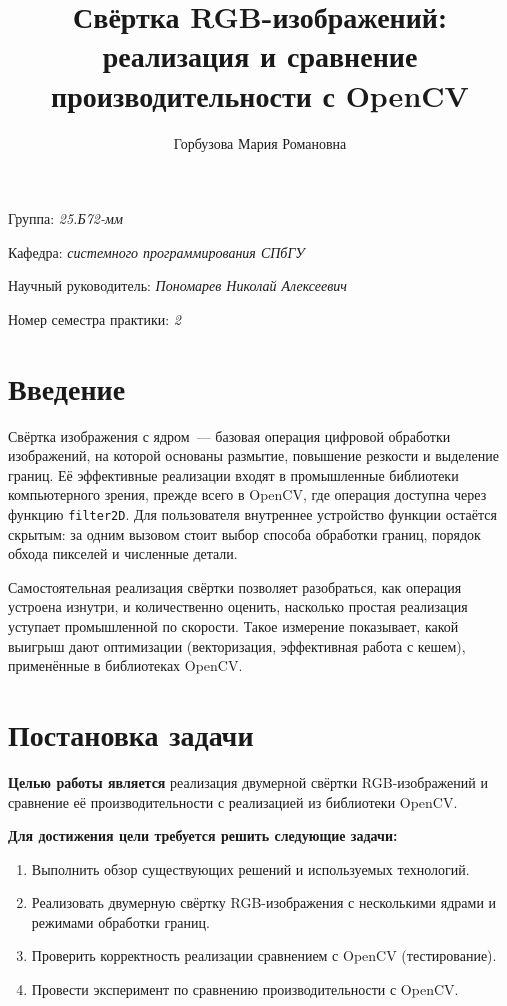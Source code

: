 \documentclass[a4paper]{article}
\title{Свёртка RGB-изображений: реализация и сравнение производительности с OpenCV}
\author{Горбузова Мария Романовна}
\date{}
\begin{document}
\maketitle

\begin{flushright}
    Группа: \emph{25.Б72-мм}

    Кафедра: \emph{системного программирования СПбГУ}

    Научный руководитель: \emph{Пономарев Николай Алексеевич}

    Номер семестра практики: \emph{2}
\end{flushright}

\section{Введение}

Свёртка изображения с ядром~--- базовая операция цифровой обработки изображений, на которой основаны размытие, повышение резкости и выделение границ. Её эффективные реализации входят в промышленные библиотеки компьютерного зрения, прежде всего в OpenCV, где операция доступна через функцию \texttt{filter2D}. Для пользователя внутреннее устройство функции остаётся скрытым: за одним вызовом стоит выбор способа обработки границ, порядок обхода пикселей и численные детали.

Самостоятельная реализация свёртки позволяет разобраться, как операция устроена изнутри, и количественно оценить, насколько простая реализация уступает промышленной по скорости. Такое измерение показывает, какой выигрыш дают оптимизации (векторизация, эффективная работа с кешем), применённые в библиотеках OpenCV.

\section{Постановка задачи}

\textbf{Целью работы является} реализация двумерной свёртки RGB-изображений и сравнение её производительности с реализацией из библиотеки OpenCV.

\textbf{Для достижения цели требуется решить следующие задачи:}
\begin{enumerate}
    \item Выполнить обзор существующих решений и используемых технологий.
    \item Реализовать двумерную свёртку RGB-изображения с несколькими ядрами и режимами обработки границ.
    \item Проверить корректность реализации сравнением с OpenCV (тестирование).
    \item Провести эксперимент по сравнению производительности с OpenCV.
\end{enumerate}
\end{document}
